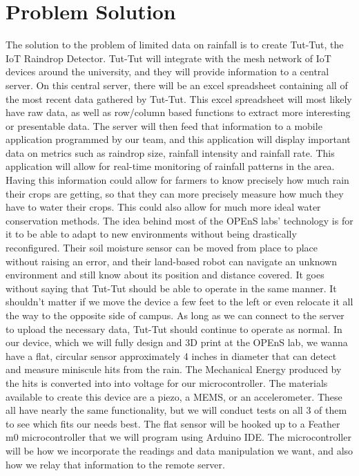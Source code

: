 \documentclass[letterpaper,10pt]{article}
\begin{document}
\section{Problem Solution}
The solution to the problem of limited data on rainfall is to create Tut-Tut, the IoT Raindrop Detector. Tut-Tut will integrate with the mesh network of IoT devices around the university, and they will provide information to a central server. On this central server, there will be an excel spreadsheet containing all of the most recent data gathered by Tut-Tut. This excel spreadsheet will most likely have raw data, as well as row/column based functions to extract more interesting or presentable data. The server will then feed that information to a mobile application programmed by our team, and this application will display important data on metrics such as raindrop size, rainfall intensity and rainfall rate. This application will allow for real-time monitoring of rainfall patterns in the area. Having this information could allow for farmers to know precisely how much rain their crops are getting, so that they can more precisely measure how much they have to water their crops. This could also allow for much more ideal water conservation methods. 
\newline
\newline
The idea behind most of the OPEnS labs' technology is for it to be able to adapt to new environments without being drastically reconfigured. Their soil moisture sensor can be moved from place to place without raising an error, and their land-based robot can navigate an unknown environment and still know about its position and distance covered. It goes without saying that Tut-Tut should be able to operate in the same manner. It shouldn't matter if we move the device a few feet to the left or even relocate it all the way to the opposite side of campus. As long as we can connect to the server to upload the necessary data, Tut-Tut should continue to operate as normal.
\newline
\newline
In our device, which we will fully design and 3D print at the OPEnS lab, we wanna have a flat, circular sensor approximately 4 inches in diameter that can detect and measure miniscule hits from the rain. The Mechanical Energy produced by the hits is converted into into voltage for our microcontroller. The materials available to create this device are a piezo, a MEMS, or an accelerometer. These all have nearly the same functionality, but we will conduct tests on all 3 of them to see which fits our needs best. The flat sensor will be hooked up to a Feather m0 microcontroller that we will program using Arduino IDE. The microcontroller will be how we incorporate the readings and data manipulation we want, and also how we relay that information to the remote server.
\newline
\newline
\end{document}

